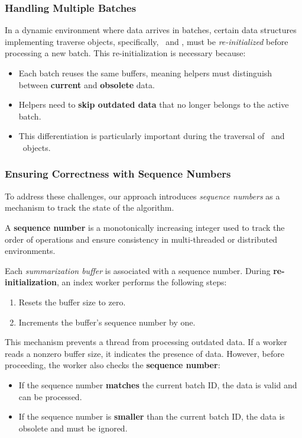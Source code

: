 {\subsubsection{Handling Multiple Batches}  

In a dynamic environment where data arrives in batches, certain data structures
implementing traverse objects, specifically, \BC\ and \PS , must be
\textit{re-initialized} before processing a new batch. This re-initialization
is necessary because:  
\begin{itemize}  
    \item Each batch reuses the same buffers, meaning helpers must distinguish
    between \textbf{current} and \textbf{obsolete} data.  
    \item Helpers need to \textbf{skip outdated data} that no longer belongs to
    the active batch.  
    \item This differentiation is particularly important during the traversal of
    \TP\ and \PS\ objects.  
\end{itemize}  

\subsubsection{Ensuring Correctness with Sequence Numbers}  

To address these challenges, our approach introduces \textit{sequence numbers}
as a mechanism to track the state of the algorithm.  

\begin{definition}  
A \textbf{sequence number} is a monotonically increasing integer used to track  
the order of operations and ensure consistency in multi-threaded or
distributed environments.  
\end{definition}  

Each \textit{summarization buffer} is associated with a sequence number.
During \textbf{re-initialization}, an index worker performs the following steps:  
\begin{enumerate}  
    \item Resets the buffer size to zero.  
    \item Increments the buffer's sequence number by one.  
\end{enumerate}  

This mechanism prevents a thread from processing outdated data. If a worker reads
a nonzero buffer size, it indicates the presence of data. However, before proceeding,
the worker also checks the \textbf{sequence number}:  
\begin{itemize}  
    \item If the sequence number \textbf{matches} the current batch ID,
     the data is valid and can be processed.  
    \item If the sequence number is \textbf{smaller} than the current batch ID,
     the data is obsolete and must be ignored.  
\end{itemize}  

}
